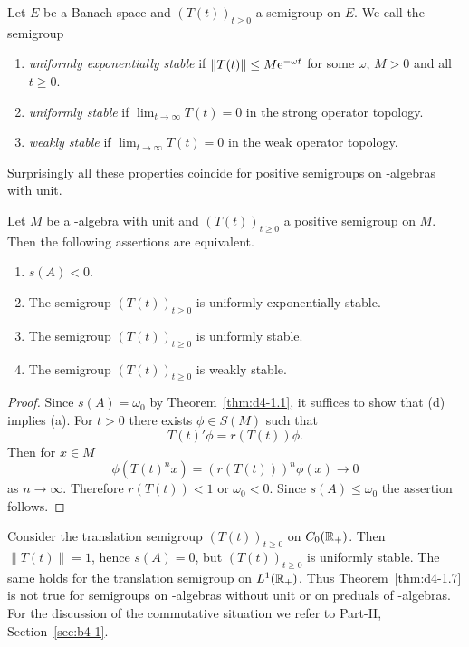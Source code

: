 \begin{definition}\label{def:d4-1.6}
Let $E$ be a Banach space and $(T(t))_{t \geq 0}$ a semigroup on $E$.
We call the semigroup
\begin{enumerate}[\upshape (i)]
\item 
\emph{uniformly exponentially stable} if\/ $\|T(t)\| \leq M\eu^{-\omega t}$ for some $\omega$, $M > 0$ and all $t \geq 0$.

\item 
\emph{uniformly stable} if\/ $\lim_{t \to \infty} T(t) = 0$ in the strong operator topology.

\item 
\emph{weakly stable} if\/ $\lim_{t \to \infty} T(t) = 0$ in the weak operator topology.
\end{enumerate}
\end{definition}
Surprisingly all these properties coincide for positive semigroups on \CA-algebras with unit.
\begin{theorem}\label{thm:d4-1.7}
Let $M$ be a \CA-algebra with unit and $(T(t))_{t \geq 0}$ a positive semigroup on $M$.
Then the following assertions are equivalent.
\begin{enumerate}[\upshape (a)]
\item 
$s(A) < 0$.

\item 
The semigroup $(T(t))_{t \geq 0}$ is uniformly exponentially stable.

\item 
The semigroup $(T(t))_{t \geq 0}$ is uniformly stable.

\item 
The semigroup $(T(t))_{t \geq 0}$ is weakly stable.

\end{enumerate}
\end{theorem}
\begin{proof}
Since $s(A) = \omega_{0}$ by Theorem~\ref{thm:d4-1.1}, it suffices to show that (d) implies (a).
For $t > 0$ there exists $\phi \in S(M)$ such that
\[
    T(t)'\phi = r(T(t))\phi .
\]
Then for $x \in M$
\[
    \phi(T(t)^{n}x) = (r(T(t)))^{n} \phi(x) \to 0
\]
as $n \to \infty$.
Therefore $r(T(t)) < 1$ or $\omega_{0} < 0$.
Since $s(A) \leq \omega_{0}$ the assertion follows.
\end{proof}
\begin{remark}\label{rem:d4-1.8}
Consider the translation semigroup $(T(t))_{t \geq 0}$ on $C_{0}(\mathbb{R}_{+})$. 
Then {$\|T(t)\| = 1$}, hence $s(A) = 0$, but $(T(t))_{t \geq 0}$ is uniformly stable.
The same holds for the translation semigroup on $L^1(\mathbb{R}_{+})$.
Thus Theorem~\ref{thm:d4-1.7} is not true for semigroups on \CA-algebras without unit or on preduals of \WA-algebras.
For the discussion of the commutative situation we refer to Part-II, Section~\ref{sec:b4-1}.
\end{remark}
